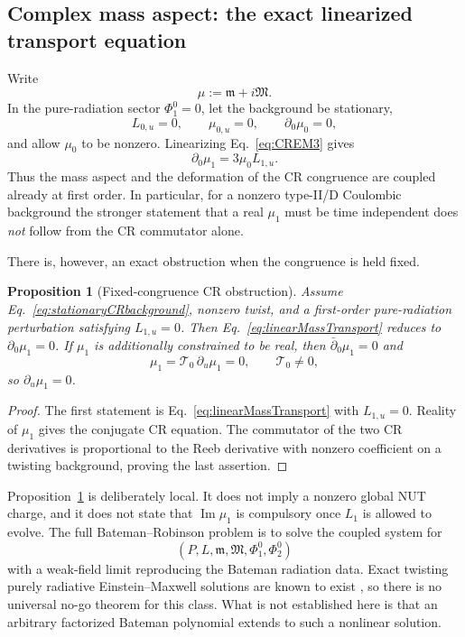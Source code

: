 \documentclass[aps,prd,reprint,nofootinbib,superscriptaddress]{revtex4-2}
\newtheorem{proposition}[theorem]{Proposition}
\theoremstyle{definition}
\theoremstyle{remark}
\begin{document}
\subsection{Complex mass aspect: the exact linearized transport equation}

Write
\begin{equation}
 \mu:=\mathfrak m+i\mathfrak M.
\end{equation}
In the pure-radiation sector $\Phi_1^0=0$, let the background be stationary,
\begin{equation}
 L_{0,u}=0,\qquad \mu_{0,u}=0,\qquad \partial_0\mu_0=0,
 \label{eq:stationaryCRbackground}
\end{equation}
and allow $\mu_0$ to be nonzero. Linearizing Eq.~\eqref{eq:CREM3} gives
\begin{equation}
 \boxed{\partial_0\mu_1=3\mu_0 L_{1,u}.}
 \label{eq:linearMassTransport}
\end{equation}
Thus the mass aspect and the deformation of the CR congruence are coupled already at first order. In particular, for a nonzero type-II/D Coulombic background the stronger statement that a real $\mu_1$ must be time independent does \emph{not} follow from the CR commutator alone.

There is, however, an exact obstruction when the congruence is held fixed.
\begin{proposition}[Fixed-congruence CR obstruction]
\label{prop:fixedCRobstruction}
Assume Eq.~\eqref{eq:stationaryCRbackground}, nonzero twist, and a first-order pure-radiation perturbation satisfying $L_{1,u}=0$. Then Eq.~\eqref{eq:linearMassTransport} reduces to $\partial_0\mu_1=0$. If $\mu_1$ is additionally constrained to be real, then $\bar\partial_0\mu_1=0$ and
\begin{equation}
 [\partial_0,\bar\partial_0]\mu_1
 =\mathcal T_0\,\partial_u\mu_1=0,
 \qquad \mathcal T_0\ne0,
 \label{eq:CRcommutator}
\end{equation}
so $\partial_u\mu_1=0$.
\end{proposition}
\begin{proof}
The first statement is Eq.~\eqref{eq:linearMassTransport} with $L_{1,u}=0$. Reality of $\mu_1$ gives the conjugate CR equation. The commutator of the two CR derivatives is proportional to the Reeb derivative with nonzero coefficient on a twisting background, proving the last assertion.
\end{proof}

Proposition~\ref{prop:fixedCRobstruction} is deliberately local. It does not imply a nonzero global NUT charge, and it does not state that $\operatorname{Im}\mu_1$ is compulsory once $L_1$ is allowed to evolve. The full Bateman--Robinson problem is to solve the coupled system for
\begin{equation}
 (P,L,\mathfrak m,\mathfrak M,\Phi_1^0,\Phi_2^0)
 \label{eq:CRstate}
\end{equation}
with a weak-field limit reproducing the Bateman radiation data. Exact twisting purely radiative Einstein--Maxwell solutions are known to exist \cite{NurowskiTafel1992}, so there is no universal no-go theorem for this class. What is not established here is that an arbitrary factorized Bateman polynomial extends to such a nonlinear solution.
\end{document}
